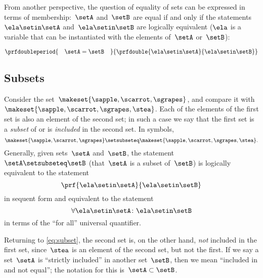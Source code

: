 From another perspective, the question of equality of sets can be expressed in terms of membership:~$\setA$ and~$\setB$ are equal if and only if the statements~$\ela \setin\setA$ and~$\ela \setin\setB$ are logically equivalent ($\ela$ is a variable that can be instantiated with the elements of~$\setA$ or~$\setB$):

\begin{equation*}
    \prfdoubleperiod{
        \quad \setA = \setB \quad
    }{
        \prfdouble{
            \ela \setin\setA
        }{
            \ela \setin\setB
        }
    }
\end{equation*}


\subsection{Subsets}

Consider the set~$\makeset{ \sapple, \scarrot, \sgrapes }$, and compare it with~$\makeset{ \sapple, \scarrot, \sgrapes, \stea }$.
Each of the elements of the first set is also an element of the second set;
in such a case we say that the first set is a \emph{subset} of or is \emph{included} in the second set.
In symbols,
%
\begin{equation}
    \label{eq:subset}
    \makeset{ \sapple, \scarrot, \sgrapes } \setsubseteq \makeset{ \sapple, \scarrot, \sgrapes, \stea }.
\end{equation}
%
Generally, given sets~$\setA$ and~$\setB$, the statement~$\setA \setsubseteq \setB$ (that~$\setA$ is a subset of~$\setB$) is logically equivalent to the statement
%
\begin{equation*}
    \prf{
        \ela \setin\setA
    }{
        \ela \setin\setB
    }
\end{equation*}
in sequent form and equivalent to the statement
\begin{equation}\label{eq:inclusion-via-quantifier}
    \forall \ela \setin\setA \colon \ela \setin\setB
\end{equation}
in terms of the ``for all'' universal quantifier.

Returning to \cref{eq:subset}, the second set is, on the other hand, \emph{not} included in the first set, since~$\stea$ is an element of the second set, but not the first.
If we say a set~$\setA$ is ``strictly included'' in another set~$\setB$, then we mean ``included in and not equal''; the notation for this is~$\setA \subset \setB$.

